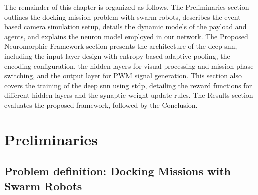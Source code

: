 The remainder of this chapter is organized as follows. The Preliminaries section outlines the docking mission problem with swarm robots, describes the event-based camera simulation setup, details the dynamic models of the payload and agents, and explains the neuron model employed in our network. The Proposed Neuromorphic Framework section presents the architecture of the deep \ac{snn}, including the input layer design with entropy-based adaptive pooling, the encoding configuration, the hidden layers for visual processing and mission phase switching, and the output layer for PWM signal generation. This section also covers the training of the deep \ac{snn} using \ac{stdp}, detailing the reward functions for different hidden layers and the synaptic weight update rules. The Results section evaluates the proposed framework, followed by the Conclusion.


\section{Preliminaries}
\subsection{Problem definition: Docking Missions with Swarm Robots}



